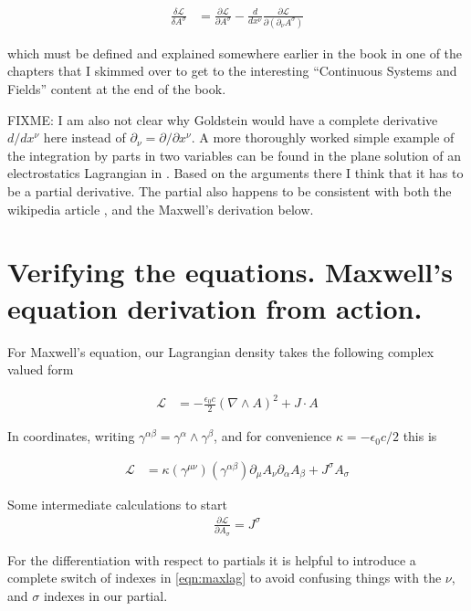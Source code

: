 \documentclass{article}
\newcommand{\LL}[0]{\mathcal{L}}
\newcommand{\PD}[2]{\frac{\partial {#2}}{\partial {#1}}}
\newcommand{\grad}[0]{\nabla}
\begin{document}
\begin{align*}
\frac{\delta \LL}{\delta A^\sigma} &= \PD{A^\sigma}{\LL} - \frac{d}{dx^\nu} \PD{(\partial_\nu A^\sigma)}{\LL}
\end{align*}

which must be defined and explained somewhere earlier in the book in one of the chapters that I skimmed over to get to the interesting ``Continuous Systems and Fields'' content
at the end of the book.

FIXME: I am also not clear why Goldstein would have a complete derivative $d/dx^\nu$ here instead of $\partial_\nu = \partial/{\partial x^\nu}$.  A more thoroughly worked simple example
of the integration by parts in two variables can be found in the plane solution of an electrostatics Lagrangian in \cite{PJMaxwellLagrangian}.  Based on the arguments there I think that it has to be a partial derivative.   The partial also happens to be consistent with both the wikipedia article \cite{wikiemtensor}, and the Maxwell's derivation below.

\section{ Verifying the equations.  Maxwell's equation derivation from action. }

For Maxwell's equation, our Lagrangian density takes the following complex valued form

\begin{align}\label{eqn:maxlag}
\LL &= -\frac{\epsilon_0 c}{2} (\grad \wedge A)^2 + J \cdot A
\end{align}

In coordinates, writing $\gamma^{\alpha\beta} = \gamma^\alpha \wedge \gamma^\beta$, and 
for convenience $\kappa = -\epsilon_0 c /2$ this is

\begin{align}\label{eqn:maxlagcomp}
\LL &= \kappa (\gamma^{\mu\nu}) (\gamma^{\alpha\beta}) \partial_\mu A_\nu \partial_\alpha A_\beta + J^\sigma A_\sigma
\end{align}

Some intermediate calculations to start
\begin{align*}
\PD{A_\sigma}{\LL} = J^\sigma
\end{align*}

For the differentiation with respect to partials it is helpful to introduce a complete switch of indexes in \ref{eqn:maxlag}
to avoid confusing things with the $\nu$, and $\sigma$ indexes in our partial.
\end{document}
